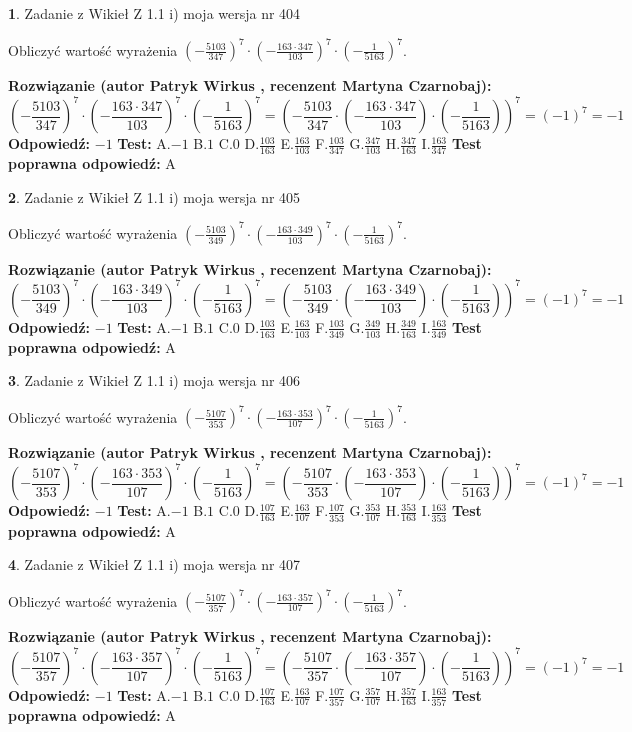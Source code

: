 \documentclass[12pt, a4paper]{article}
\theoremstyle{definition} %
\newtheorem{zad}{}
\newcommand{\zadStart}[1]{\begin{zad}#1\newline}
\newcommand{\zadStop}{\end{zad}}
\newcommand{\rozwStart}[2]{\noindent \textbf{Rozwiązanie (autor #1 , recenzent #2): }\newline}
\newcommand{\rozwStop}{\newline}
\newcommand{\odpStart}{\noindent \textbf{Odpowiedź:}\newline}
\newcommand{\odpStop}{\newline}
\newcommand{\testStart}{\noindent \textbf{Test:}\newline}
\newcommand{\testStop}{\newline}
\newcommand{\kluczStart}{\noindent \textbf{Test poprawna odpowiedź:}\newline}
\newcommand{\kluczStop}{\newline}
\begin{document}
\zadStart{Zadanie z Wikieł Z 1.1 i) moja wersja nr 404}

Obliczyć wartość wyrażenia $(-\frac{5103}{347})^{7} \cdot (-\frac{163 \cdot 347}{103})^{7} \cdot (-\frac{1}{5163})^{7}$.
\zadStop
\rozwStart{Patryk Wirkus}{Martyna Czarnobaj}
$$(-\frac{5103}{347})^{7} \cdot (-\frac{163 \cdot 347}{103})^{7} \cdot (-\frac{1}{5163})^{7} = (-\frac{5103}{347} \cdot (-\frac{163 \cdot 347}{103}) \cdot (-\frac{1}{5163}))^{7} = (-1)^{7} = -1$$
\rozwStop
\odpStart
$-1$
\odpStop
\testStart
A.$-1$ B.$1$ C.$0$ D.$\frac{103}{163}$ E.$\frac{163}{103}$
F.$\frac{103}{347}$ G.$\frac{347}{103}$
H.$\frac{347}{163}$
I.$\frac{163}{347}$
\testStop
\kluczStart
A
\kluczStop



\zadStart{Zadanie z Wikieł Z 1.1 i) moja wersja nr 405}

Obliczyć wartość wyrażenia $(-\frac{5103}{349})^{7} \cdot (-\frac{163 \cdot 349}{103})^{7} \cdot (-\frac{1}{5163})^{7}$.
\zadStop
\rozwStart{Patryk Wirkus}{Martyna Czarnobaj}
$$(-\frac{5103}{349})^{7} \cdot (-\frac{163 \cdot 349}{103})^{7} \cdot (-\frac{1}{5163})^{7} = (-\frac{5103}{349} \cdot (-\frac{163 \cdot 349}{103}) \cdot (-\frac{1}{5163}))^{7} = (-1)^{7} = -1$$
\rozwStop
\odpStart
$-1$
\odpStop
\testStart
A.$-1$ B.$1$ C.$0$ D.$\frac{103}{163}$ E.$\frac{163}{103}$
F.$\frac{103}{349}$ G.$\frac{349}{103}$
H.$\frac{349}{163}$
I.$\frac{163}{349}$
\testStop
\kluczStart
A
\kluczStop



\zadStart{Zadanie z Wikieł Z 1.1 i) moja wersja nr 406}

Obliczyć wartość wyrażenia $(-\frac{5107}{353})^{7} \cdot (-\frac{163 \cdot 353}{107})^{7} \cdot (-\frac{1}{5163})^{7}$.
\zadStop
\rozwStart{Patryk Wirkus}{Martyna Czarnobaj}
$$(-\frac{5107}{353})^{7} \cdot (-\frac{163 \cdot 353}{107})^{7} \cdot (-\frac{1}{5163})^{7} = (-\frac{5107}{353} \cdot (-\frac{163 \cdot 353}{107}) \cdot (-\frac{1}{5163}))^{7} = (-1)^{7} = -1$$
\rozwStop
\odpStart
$-1$
\odpStop
\testStart
A.$-1$ B.$1$ C.$0$ D.$\frac{107}{163}$ E.$\frac{163}{107}$
F.$\frac{107}{353}$ G.$\frac{353}{107}$
H.$\frac{353}{163}$
I.$\frac{163}{353}$
\testStop
\kluczStart
A
\kluczStop



\zadStart{Zadanie z Wikieł Z 1.1 i) moja wersja nr 407}

Obliczyć wartość wyrażenia $(-\frac{5107}{357})^{7} \cdot (-\frac{163 \cdot 357}{107})^{7} \cdot (-\frac{1}{5163})^{7}$.
\zadStop
\rozwStart{Patryk Wirkus}{Martyna Czarnobaj}
$$(-\frac{5107}{357})^{7} \cdot (-\frac{163 \cdot 357}{107})^{7} \cdot (-\frac{1}{5163})^{7} = (-\frac{5107}{357} \cdot (-\frac{163 \cdot 357}{107}) \cdot (-\frac{1}{5163}))^{7} = (-1)^{7} = -1$$
\rozwStop
\odpStart
$-1$
\odpStop
\testStart
A.$-1$ B.$1$ C.$0$ D.$\frac{107}{163}$ E.$\frac{163}{107}$
F.$\frac{107}{357}$ G.$\frac{357}{107}$
H.$\frac{357}{163}$
I.$\frac{163}{357}$
\testStop
\kluczStart
A
\kluczStop
\end{document}
